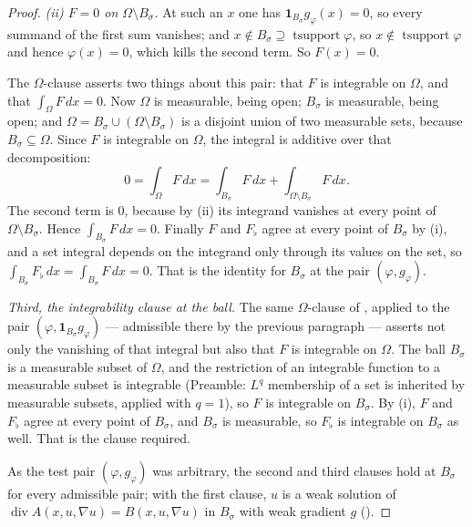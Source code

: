 \begin{proof}
\emph{(ii) $F=0$ on $\Omega\setminus B_\sigma$.}  At such an $x$ one has
$\mathbf1_{B_\sigma}g_\varphi(x)=0$, so every summand of the first sum vanishes;
and $x\notin B_\sigma\supseteq\operatorname{tsupport}\varphi$, so
$x\notin\operatorname{tsupport}\varphi$ and hence $\varphi(x)=0$, which kills the
second term.  So $F(x)=0$.

The $\Omega$-clause asserts two things about this pair: that $F$ is integrable on
$\Omega$, and that $\int_\Omega F\,dx=0$.  Now $\Omega$ is measurable, being
open; $B_\sigma$ is measurable, being open; and
$\Omega=B_\sigma\cup(\Omega\setminus B_\sigma)$ is a disjoint union of two
measurable sets, because $B_\sigma\subseteq\Omega$.  Since $F$ is integrable on
$\Omega$, the integral is additive over that decomposition:
\[
0=\int_\Omega F\,dx=\int_{B_\sigma}F\,dx+\int_{\Omega\setminus B_\sigma}F\,dx .
\]
The second term is $0$, because by (ii) its integrand vanishes at every point of
$\Omega\setminus B_\sigma$.  Hence $\int_{B_\sigma}F\,dx=0$.  Finally $F$ and
$F_\flat$ agree at every point of $B_\sigma$ by (i), and a set integral depends
on the integrand only through its values on the set, so
$\int_{B_\sigma}F_\flat\,dx=\int_{B_\sigma}F\,dx=0$.  That is the identity for
$B_\sigma$ at the pair $(\varphi,g_\varphi)$.

\emph{Third, the integrability clause at the ball.}  The same
$\Omega$-clause of , applied to the pair
$(\varphi,\mathbf1_{B_\sigma}g_\varphi)$ --- admissible there by the previous
paragraph --- asserts not only the vanishing of that integral but also that $F$
is integrable on $\Omega$.  The ball $B_\sigma$ is a measurable subset of
$\Omega$, and the restriction of an integrable function to a measurable subset is
integrable (Preamble: $L^q$ membership of a set is inherited by measurable
subsets, applied with $q=1$), so $F$ is integrable on $B_\sigma$.  By (i), $F$ and $F_\flat$ agree at every point of
$B_\sigma$, and $B_\sigma$ is measurable, so $F_\flat$ is integrable on
$B_\sigma$ as well.  That is the clause required.

As the test pair $(\varphi,g_\varphi)$ was arbitrary, the second and third
clauses hold at $B_\sigma$ for every admissible pair; with the first clause, $u$
is a weak solution of $\operatorname{div}A(x,u,\nabla u)=B(x,u,\nabla u)$ in
$B_\sigma$ with weak gradient $g$ ().
\end{proof}
